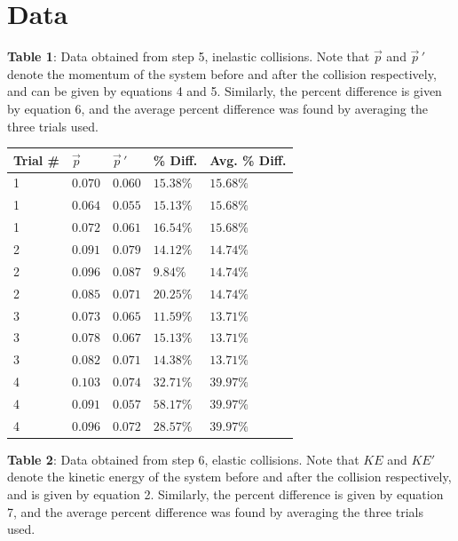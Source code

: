 \documentclass{article}
\theoremstyle{definition}
\begin{document}
\section{Data}
\textbf{Table 1}: Data obtained from step 5, inelastic collisions. Note that $\vec{p}$ and $\vec{p}\,'$ denote the momentum of the system before and after the collision respectively, 
and can be given by equations 4 and 5. Similarly, the percent difference is given by equation 6, and the average percent difference was found by averaging the three trials used.
\begin{center}
    \begin{tabular}{|m{4em} | m{1cm} | m{1cm} | m{2cm}| m{2cm}|} 
    \hline
    Trial \# & $\vec{p}$ & $\vec{p}\,'$ & \% Diff. &  Avg. \% Diff. \\ 
    \hline\hline
    1 & $0.070$ & $0.060$ & $15.38\%$ & $15.68\%$ \\ 
    \hline
    1 & $0.064$ & $0.055$ & $15.13\%$ & $15.68\%$ \\ 
    \hline
    1 & $0.072$ & $0.061$ & $16.54\%$ & $15.68\%$ \\ 
    \hline
    2 & $0.091$ & $0.079$ & $14.12\%$ & $14.74\%$ \\ 
    \hline
    2 & $0.096$ & $0.087$ & $9.84\%$ & $14.74\%$ \\ 
    \hline
    2 & $0.085$ & $0.071$ & $20.25\%$ & $14.74\%$ \\ 
    \hline\hline
    3 & $0.073$ & $0.065$ & $11.59\%$ & $13.71\%$ \\ 
    \hline
    3 & $0.078$ & $0.067$ & $15.13\%$ & $13.71\%$ \\ 
    \hline
    3 & $0.082$ & $0.071$ & $14.38\%$ & $13.71\%$ \\ 
    \hline
    4 & $0.103$ & $0.074$ & $32.71\%$ & $39.97\%$ \\ 
    \hline
    4 & $0.091$ & $0.057$ & $58.17\%$ & $39.97\%$ \\ 
    \hline
    4 & $0.096$ & $0.072$ & $28.57\%$ & $39.97\%$ \\ 
    \hline
   \end{tabular}
\end{center}
\textbf{Table 2}: Data obtained from step 6, elastic collisions. Note that $KE$ and $KE'$ denote the kinetic energy of the system before and after the collision respectively, 
and is given by equation 2. Similarly, the percent difference is given by equation 7, and the average percent difference was found by averaging the three trials used.
\end{document}
